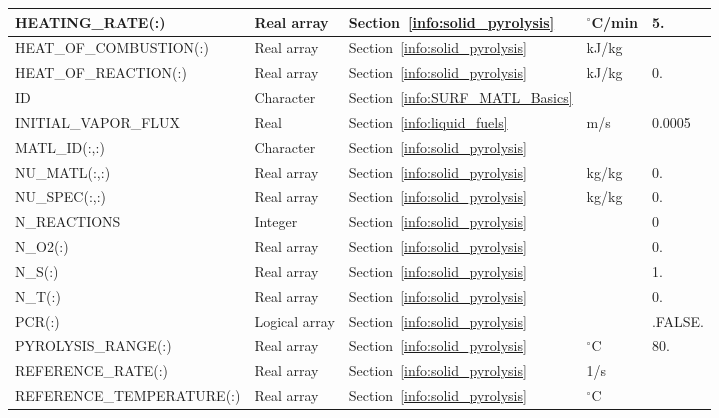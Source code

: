 \documentclass[11pt]{book}
\begin{document}
\begin{longtable}{@{\extracolsep{\fill}}|l|l|l|l|l|}
{\ct HEATING\_RATE(:)}              & Real array    & Section~\ref{info:solid_pyrolysis}    & $^\circ$C/min     & 5.     \\ \hline
{\ct HEAT\_OF\_COMBUSTION(:)}       & Real array    & Section~\ref{info:solid_pyrolysis}    & kJ/kg             &        \\ \hline
{\ct HEAT\_OF\_REACTION(:)}         & Real array    & Section~\ref{info:solid_pyrolysis}    & kJ/kg             & 0.     \\ \hline
{\ct ID     }                       & Character     & Section~\ref{info:SURF_MATL_Basics}   &                   &        \\ \hline
{\ct INITIAL\_VAPOR\_FLUX}          & Real          & Section~\ref{info:liquid_fuels}       & m/s               & 0.0005 \\ \hline
{\ct MATL\_ID(:,:)}                 & Character     & Section~\ref{info:solid_pyrolysis}    &                   &        \\ \hline
{\ct NU\_MATL(:,:)}                 & Real array    & Section~\ref{info:solid_pyrolysis}    & kg/kg             & 0.     \\ \hline
{\ct NU\_SPEC(:,:)}                 & Real array    & Section~\ref{info:solid_pyrolysis}    & kg/kg             & 0.     \\ \hline
{\ct N\_REACTIONS}                  & Integer       & Section~\ref{info:solid_pyrolysis}    &                   & 0      \\ \hline
{\ct N\_O2(:)}                      & Real array    & Section~\ref{info:solid_pyrolysis}    &                   & 0.     \\ \hline
{\ct N\_S(:)}                       & Real array    & Section~\ref{info:solid_pyrolysis}    &                   & 1.     \\ \hline
{\ct N\_T(:)}                       & Real array    & Section~\ref{info:solid_pyrolysis}    &                   & 0.     \\ \hline
{\ct PCR(:)}                        & Logical array & Section~\ref{info:solid_pyrolysis}    &                   & {\ct.FALSE.}\\ \hline
{\ct PYROLYSIS\_RANGE(:)}           & Real array    & Section~\ref{info:solid_pyrolysis}    & $^\circ$C         & 80.    \\ \hline
{\ct REFERENCE\_RATE(:)}            & Real array    & Section~\ref{info:solid_pyrolysis}    & 1/s               &        \\ \hline
{\ct REFERENCE\_TEMPERATURE(:)}     & Real array    & Section~\ref{info:solid_pyrolysis}    & $^\circ$C         &        \\ \hline

\end{longtable}
\end{document}
